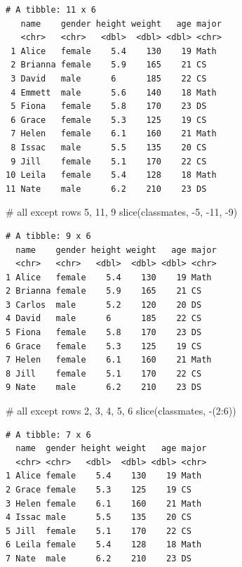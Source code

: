 \documentclass[
  letterpaper,
  DIV=11,
  numbers=noendperiod]{scrreprt}
\newenvironment{Shaded}{\begin{snugshade}}{\end{snugshade}}
\newcommand{\CommentTok}[1]{\textcolor[rgb]{0.37,0.37,0.37}{#1}}
\newcommand{\DecValTok}[1]{\textcolor[rgb]{0.68,0.00,0.00}{#1}}
\newcommand{\FunctionTok}[1]{\textcolor[rgb]{0.28,0.35,0.67}{#1}}
\newcommand{\NormalTok}[1]{\textcolor[rgb]{0.00,0.23,0.31}{#1}}
\newcommand{\SpecialCharTok}[1]{\textcolor[rgb]{0.37,0.37,0.37}{#1}}
\begin{document}
\begin{verbatim}
# A tibble: 11 x 6
   name    gender height weight   age major
   <chr>   <chr>   <dbl>  <dbl> <dbl> <chr>
 1 Alice   female    5.4    130    19 Math 
 2 Brianna female    5.9    165    21 CS   
 3 David   male      6      185    22 CS   
 4 Emmett  male      5.6    140    18 Math 
 5 Fiona   female    5.8    170    23 DS   
 6 Grace   female    5.3    125    19 CS   
 7 Helen   female    6.1    160    21 Math 
 8 Issac   male      5.5    135    20 CS   
 9 Jill    female    5.1    170    22 CS   
10 Leila   female    5.4    128    18 Math 
11 Nate    male      6.2    210    23 DS   
\end{verbatim}

\begin{Shaded}
\begin{Highlighting}[]
\CommentTok{\# all except rows 5, 11, 9}
\FunctionTok{slice}\NormalTok{(classmates, }\SpecialCharTok{{-}}\DecValTok{5}\NormalTok{, }\SpecialCharTok{{-}}\DecValTok{11}\NormalTok{, }\SpecialCharTok{{-}}\DecValTok{9}\NormalTok{)}
\end{Highlighting}
\end{Shaded}

\begin{verbatim}
# A tibble: 9 x 6
  name    gender height weight   age major
  <chr>   <chr>   <dbl>  <dbl> <dbl> <chr>
1 Alice   female    5.4    130    19 Math 
2 Brianna female    5.9    165    21 CS   
3 Carlos  male      5.2    120    20 DS   
4 David   male      6      185    22 CS   
5 Fiona   female    5.8    170    23 DS   
6 Grace   female    5.3    125    19 CS   
7 Helen   female    6.1    160    21 Math 
8 Jill    female    5.1    170    22 CS   
9 Nate    male      6.2    210    23 DS   
\end{verbatim}

\begin{Shaded}
\begin{Highlighting}[]
\CommentTok{\# all except rows 2, 3, 4, 5, 6}
\FunctionTok{slice}\NormalTok{(classmates, }\SpecialCharTok{{-}}\NormalTok{(}\DecValTok{2}\SpecialCharTok{:}\DecValTok{6}\NormalTok{))}
\end{Highlighting}
\end{Shaded}

\begin{verbatim}
# A tibble: 7 x 6
  name  gender height weight   age major
  <chr> <chr>   <dbl>  <dbl> <dbl> <chr>
1 Alice female    5.4    130    19 Math 
2 Grace female    5.3    125    19 CS   
3 Helen female    6.1    160    21 Math 
4 Issac male      5.5    135    20 CS   
5 Jill  female    5.1    170    22 CS   
6 Leila female    5.4    128    18 Math 
7 Nate  male      6.2    210    23 DS   
\end{verbatim}
\end{document}
